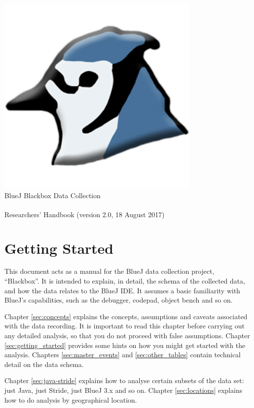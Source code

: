 \documentclass{report}
\begin{document}
\begin{titlepage}
  \begin{center}
    \includegraphics[width=10cm]{../../lib/images/bluej-icon-256.png}\\
    \huge BlueJ Blackbox Data Collection\\~\\Researchers' Handbook
    (version 2.0, 18 August 2017)
  \end{center}
\end{titlepage}

\section*{Getting Started}

This document acts as a manual for the BlueJ data collection project,
``Blackbox''.  It is intended to explain, in detail, the schema of the
collected data, and how the data relates to the BlueJ IDE.  It assumes a basic
familiarity with BlueJ's capabilities, such as the debugger, codepad, object
bench and so on.

Chapter \ref{sec:concepts} explains the concepts, assumptions and caveats
associated with the data recording.  It is important to read this chapter
before carrying out any detailed analysis, so that you do not proceed with
false assumptions.  Chapter \ref{sec:getting_started} provides some hints on
how you might get started with the analysis.  Chapters \ref{sec:master_events} and
\ref{sec:other_tables} contain technical detail on the data schema.

Chapter \ref{sec:java-stride} explains how to analyse certain subsets of the
data set: just Java, just Stride, just BlueJ 3.x and so on.  Chapter \ref{sec:locations}
explains how to do analysis by geographical location.
\end{document}
